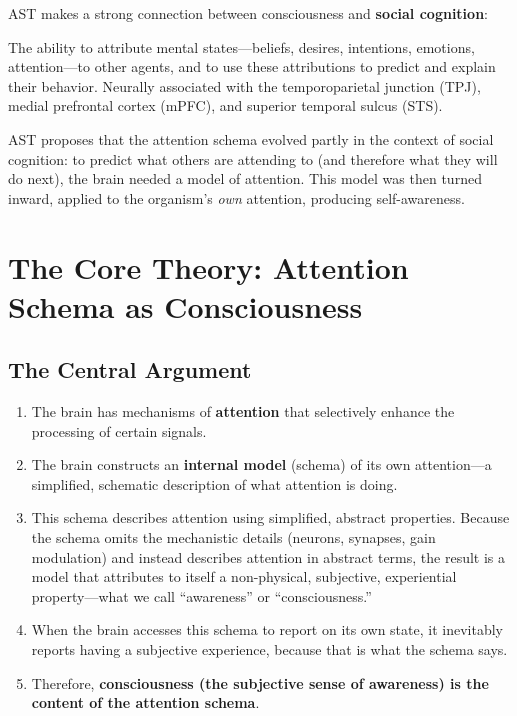 \documentclass[11pt,a4paper]{report}
\begin{document}
AST makes a strong connection between consciousness and \textbf{social cognition}:

\begin{definitionbox}
The ability to attribute mental states---beliefs, desires, intentions, emotions, attention---to other agents, and to use these attributions to predict and explain their behavior. Neurally associated with the temporoparietal junction (TPJ), medial prefrontal cortex (mPFC), and superior temporal sulcus (STS).
\end{definitionbox}

AST proposes that the attention schema evolved partly in the context of social cognition: to predict what others are attending to (and therefore what they will do next), the brain needed a model of attention. This model was then turned inward, applied to the organism's \emph{own} attention, producing self-awareness.


\chapter{The Core Theory: Attention Schema as Consciousness}

\section{The Central Argument}

\begin{principlebox}
\begin{enumerate}[leftmargin=1.5em]
  \item The brain has mechanisms of \textbf{attention} that selectively enhance the processing of certain signals.
  \item The brain constructs an \textbf{internal model} (schema) of its own attention---a simplified, schematic description of what attention is doing.
  \item This schema describes attention using simplified, abstract properties. Because the schema omits the mechanistic details (neurons, synapses, gain modulation) and instead describes attention in abstract terms, the result is a model that attributes to itself a non-physical, subjective, experiential property---what we call ``awareness'' or ``consciousness.''
  \item When the brain accesses this schema to report on its own state, it inevitably reports having a subjective experience, because that is what the schema says.
  \item Therefore, \textbf{consciousness (the subjective sense of awareness) is the content of the attention schema}.
\end{enumerate}
\end{principlebox}
\end{document}
